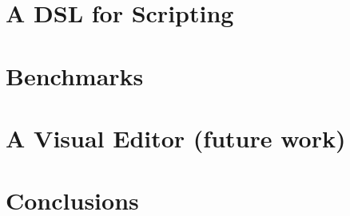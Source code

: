 \documentclass{llncs}
\begin{document}
\section{A DSL for Scripting}
\label{sec:script_combinators}
 

\label{sec:script_monad_case_study}
 

\section{Benchmarks}
\label{sec:benchmarks}
 

\section{A Visual Editor (future work)}
\label{sec:visual_editor}
 

\section{Conclusions}
\label{sec:conclusions}
 

\vfill\eject


 
\end{document}
